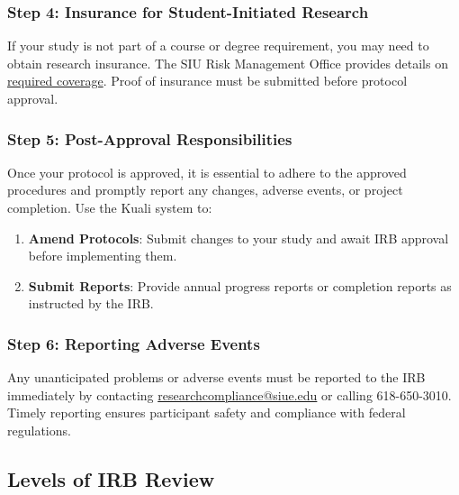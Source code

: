\documentclass[
]{book}
\providecommand{\tightlist}{%
  \setlength{\itemsep}{0pt}\setlength{\parskip}{0pt}}
\begin{document}
\subsubsection*{Step 4: Insurance for Student-Initiated Research}\label{step-4-insurance-for-student-initiated-research}

If your study is not part of a course or degree requirement, you may need to obtain research insurance. The SIU Risk Management Office provides details on \href{http://siusystem.edu/risk-management/insurancereq.shtml}{required coverage}. Proof of insurance must be submitted before protocol approval.

\subsubsection*{Step 5: Post-Approval Responsibilities}\label{step-5-post-approval-responsibilities}

Once your protocol is approved, it is essential to adhere to the approved procedures and promptly report any changes, adverse events, or project completion. Use the Kuali system to:

\begin{enumerate}
\def\labelenumi{\arabic{enumi}.}
\tightlist
\item
  \textbf{Amend Protocols}: Submit changes to your study and await IRB approval before implementing them.
\item
  \textbf{Submit Reports}: Provide annual progress reports or completion reports as instructed by the IRB.
\end{enumerate}

\subsubsection*{Step 6: Reporting Adverse Events}\label{step-6-reporting-adverse-events}

Any unanticipated problems or adverse events must be reported to the IRB immediately by contacting \href{mailto:Researchcompliance@siue.edu}{researchcompliance@siue.edu} or calling 618-650-3010. Timely reporting ensures participant safety and compliance with federal regulations.

\subsection*{Levels of IRB Review}\label{levels-of-irb-review}
\end{document}

